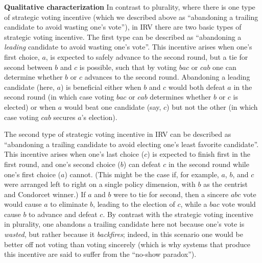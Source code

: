 \documentclass[11pt,a4paper]{article}
\begin{document}
\noindent \textbf{Qualitative characterization} In contrast to plurality, where there is one type of strategic voting incentive (which we described above as ``abandoning a trailing candidate to avoid wasting one's vote''), in IRV there are two basic types of strategic voting incentive. The first type can be described as ``abandoning a \emph{leading} candidate to avoid wasting one's vote''. This incentive arises when one's first choice, $a$, is expected to safely advance to the second round, but a tie for second between $b$ and $c$ is possible, such that by voting $bac$ or $cab$ one can determine whether $b$ or $c$ advances to the second round. 
Abandoning a leading candidate (here, $a$) is beneficial either when $b$ and $c$ would both defeat $a$ in the second round (in which case voting $bac$ or $cab$ determines whether $b$ or $c$ is elected) or when $a$ would beat one candidate (say, $c$) but not the other (in which case voting $cab$ secures $a$'s election). 

The second type of strategic voting incentive in IRV can be described as ``abandoning a trailing candidate to avoid electing one's least favorite candidate''. This incentive arises when one's last choice ($c$) is expected to finish first in the first round, and one's second choice ($b$) can defeat $c$ in the second round while one's first choice ($a$) cannot. (This might be the case if, for example, $a$, $b$, and $c$ were arranged left to right on a single policy dimension, with $b$ as the centrist and Condorcet winner.) If $a$ and $b$ were to tie for second, then a sincere $abc$ vote would cause $a$ to eliminate $b$, leading to the election of $c$, while a $bac$ vote would cause $b$ to advance and defeat $c$. By contrast with the strategic voting incentive in plurality, one abandons a trailing candidate here not because one's vote is \emph{wasted}, but rather because it \emph{backfires}; indeed, in this scenario one would be better off not voting than voting sincerely (which is why systems that produce this incentive are said to suffer from the ``no-show paradox'').\\
\end{document}
